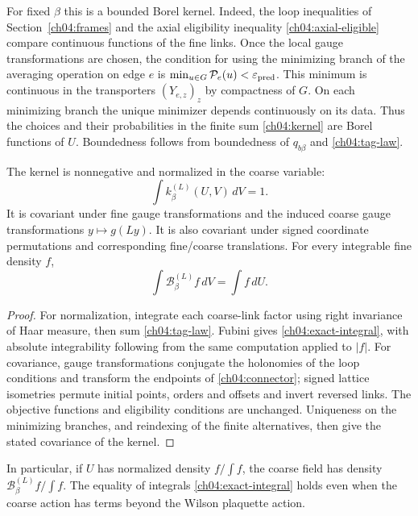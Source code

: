 For fixed $\beta$ this is a bounded Borel kernel. Indeed, the loop
inequalities of Section~\ref{ch04:frames} and the axial eligibility
inequality \eqref{ch04:axial-eligible} compare continuous functions of
the fine links. Once the local gauge transformations are chosen, the condition for using the
minimizing branch of the averaging operation on edge $e$ is
$\min_{u\in G}\mathcal P_e(u)<\varepsilon_{\rm pred}$. This minimum is
continuous in the transporters $(Y_{e,z})_z$ by compactness of $G$.
On each minimizing branch the unique minimizer depends continuously on
its data. Thus the choices and their probabilities in the finite sum
\eqref{ch04:kernel} are Borel functions of $U$. Boundedness follows
from boundedness of $q_{b\beta}$ and \eqref{ch04:tag-law}.

\begin{proposition}
\label{ch04:kernel-properties}
The kernel is nonnegative and normalized in the coarse variable:
\begin{equation}
 \int k^{(L)}_\beta(U,V)\,dV=1.
 \label{ch04:kernel-normalization}
\end{equation}
It is covariant under fine gauge transformations and the induced coarse
gauge transformations $y\mapsto g(Ly)$. It is also covariant under signed
coordinate permutations and corresponding fine/coarse translations.
For every integrable fine density $f$,
\begin{equation}
 \int\mathcal B^{(L)}_\beta f\,dV=\int f\,dU.
 \label{ch04:exact-integral}
\end{equation}
\end{proposition}
\begin{proof}
For normalization, integrate each coarse-link factor using right invariance
of Haar measure, then sum \eqref{ch04:tag-law}. Fubini gives
\eqref{ch04:exact-integral}, with absolute integrability following from
the same computation applied to $|f|$.
For covariance, gauge transformations conjugate the holonomies of the loop conditions and
transform the endpoints of \eqref{ch04:connector}; signed lattice
isometries permute initial points, orders and offsets and invert reversed links.
The objective functions and eligibility conditions are unchanged. Uniqueness
on the minimizing branches, and reindexing of the finite alternatives,
then give the stated covariance of the kernel.
\end{proof}

In particular, if $U$ has normalized density $f/\int f$, the coarse
field has density $\mathcal B^{(L)}_\beta f/\int f$. The equality of
integrals \eqref{ch04:exact-integral} holds even when the coarse action
has terms beyond the Wilson plaquette action.


